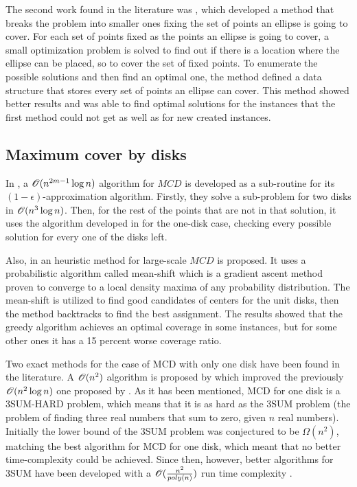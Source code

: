 The second work found in the literature was , which developed a method that breaks the problem into smaller ones fixing the set of points an ellipse is going to cover. For each set of points fixed as the points an ellipse is going to cover, a small optimization problem is solved to find out if there is a location where the ellipse can be placed, so to cover the set of fixed points. To enumerate the possible solutions and then find an optimal one, the method defined a data structure that stores every set of points an ellipse can cover. This method showed better results and was able to find optimal solutions for the instances that the first method could not get as well as for new created instances.

\subsection{Maximum cover by disks}
In , a $\mathscr{O}(n^{2m-1}\log{n})$ algorithm for $MCD$ is developed as a sub-routine for its $(1-\epsilon)$-approximation algorithm. Firstly, they solve a sub-problem for two disks in $\mathscr{O}(n^3\log{n})$. Then, for the rest of the points that are not in that solution, it uses the algorithm developed in  for the one-disk case, checking every possible solution for every one of the disks left.

Also, in  an heuristic method for large-scale $MCD$ is proposed. It uses a probabilistic algorithm called mean-shift which is a gradient ascent method proven to converge to a local density maxima of any probability distribution. The mean-shift is utilized to find good candidates of centers for the unit disks, then the method backtracks to find the best assignment. The results showed that the greedy algorithm achieves an optimal coverage in some instances, but for some other ones it has a 15 percent worse coverage ratio.

Two exact methods for the case of MCD with only one disk have been found in the literature. A $\mathscr{O}(n^2)$ algorithm is proposed by  which improved the previously $\mathscr{O}(n^2\log{n})$ one proposed by .
As it has been mentioned, MCD for one disk is a 3SUM-HARD problem, which means that it is as hard as the 3SUM problem (the problem of finding three real numbers that sum to zero, given $n$ real numbers). Initially the lower bound of the 3SUM problem was conjectured to be $\Omega(n^2)$, matching the best algorithm for MCD for one disk, which meant that no better time-complexity could be achieved. Since then, however, better algorithms for 3SUM have been developed with a $\mathscr{O}(\frac{n^2}{poly(n)})$ run time complexity \cite{3SUM-kopelowitz:2014}.

